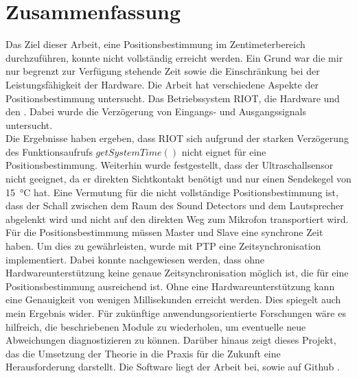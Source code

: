 \newpage
\section{Zusammenfassung}

Das Ziel dieser Arbeit, eine Positionsbestimmung im Zentimeterbereich durchzuführen, konnte nicht vollständig erreicht werden. Ein Grund war die mir nur begrenzt zur Verfügung stehende Zeit sowie die Einschränkung bei der Leistungsfähigkeit der Hardware.
Die Arbeit hat verschiedene Aspekte der Positionsbestimmung untersucht. Das Betriebssystem RIOT, die Hardware \microphone \platz und den \ultraschall. Dabei wurde die Verzögerung von Eingangs- und Ausgangssignals untersucht.
\\
Die Ergebnisse haben ergeben, dass RIOT sich aufgrund der starken Verzögerung des Funktionsaufrufs $getSystemTime()$ nicht eignet für eine Positionsbestimmung. Weiterhin wurde festgestellt, dass der Ultraschallsensor nicht geeignet, da er direkten Sichtkontakt benötigt und nur einen Sendekegel von \SI{15}{\degreeCelsius} hat. Eine Vermutung für die nicht vollständige Positionsbestimmung ist, dass der Schall zwischen dem Raum des Sound Detectors und dem Lautsprecher abgelenkt wird und nicht auf den direkten Weg zum Mikrofon transportiert wird. Für die Positionsbestimmung müssen Master und Slave eine synchrone Zeit haben. Um dies zu gewährleisten, wurde mit PTP eine Zeitsynchronisation implementiert. Dabei konnte nachgewiesen werden, dass ohne Hardwareunterstützung keine genaue Zeitsynchronisation möglich ist, die für eine Positionsbestimmung ausreichend ist. Ohne eine Hardwareunterstützung kann eine Genauigkeit von wenigen Millisekunden erreicht werden. Dies spiegelt auch mein Ergebnis wider. Für zukünftige anwendungsorientierte Forschungen wäre es hilfreich, die beschriebenen Module zu wiederholen, um eventuelle neue Abweichungen diagnostizieren zu können. Darüber hinaus zeigt dieses Projekt, das die Umsetzung der Theorie in die Praxis für die Zukunft eine Herausforderung darstellt. Die Software liegt der Arbeit bei, sowie auf Github \cite{src_GITHUB_CODE_BA}\cite{src_genauigkeit_zeit_sync} .

